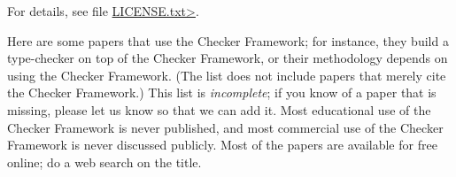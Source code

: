 \noindent
For details, see file
\href{https://raw.githubusercontent.com/typetools/checker-framework/master/LICENSE.txt}{\<LICENSE.txt>}.



Here are some papers that use the Checker Framework;
for instance, they build a type-checker on top of the Checker Framework, or
their methodology depends on using the Checker Framework.
(The list does not include papers that merely cite the Checker Framework.)
This list is \emph{incomplete}; if you know of a paper that
is missing, please let us know so that we can add it.
Most educational use of the Checker Framework is never published, and most
commercial use of the Checker Framework is never discussed publicly.
Most of the papers are available for free online; do a web search on the
title.

